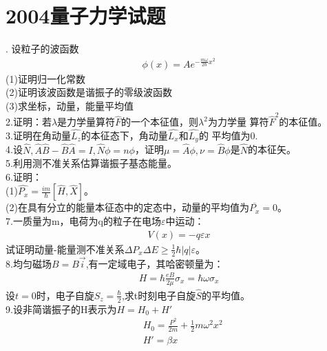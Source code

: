 \documentclass[UTF8]{article}
\title{}
\author{李承高}
\numberwithin{equation}{section}
\begin{document}
\maketitle
\thispagestyle{empty}
\newpage
\thispagestyle{empty}
\tableofcontents
\newpage

{\centering\section{2004量子力学试题}}
. 设粒子的波函数
\begin{align*}
    \phi(x)=Ae^{-\frac{m\omega}{2\hbar}x^2}
\end{align*}
(1)证明归一化常数\\
(2)证明该波函数是谐振子的零级波函数\\
(3)求坐标，动量，能量平均值\\[10pt]
2.证明：若$\lambda$是力学量算符$\hat{F}$的一个本征值，则$\lambda^2$为力学量
算符$\hat{F}^2$的本征值。\\[10pt]
3.证明在角动量$\hat{L_z}$的本征态下，角动量$\hat{L_x}$和$\hat{L_y}$的
平均值为0.\\[10pt]
4.设$\hat{N},\hat{A}\hat{B}-\hat{B}\hat{A}=I,\hat{N}\phi=n\phi$，证明$\mu=\hat{A}\phi,
\nu=\hat{B}\phi$是$\hat{N}$的本征矢。\\[10pt]
5.利用测不准关系估算谐振子基态能量。\\[10pt]
6.证明：\\
(1)$\hat{P_x}=\frac{im}{\hbar}[\hat{H},\hat{X}]$。\\
(2)在具有分立的能量本征态中的定态中，动量的平均值为$\overline{P_x}=0$。\\[10pt]
7.一质量为m，电荷为q的粒子在电场$\varepsilon$中运动：
\begin{align*}
    V(x)=-q\varepsilon x
\end{align*}
试证明动量-能量测不准关系$\Delta P_x\Delta E\geq \frac{1}{2}\hbar |q|\varepsilon$。\\[10pt]
8.均匀磁场$B=B\overrightarrow{i}$,有一定域电子，其哈密顿量为：
\begin{align*}
    H=\hbar \frac{eB}{2\mu}\sigma_x=\hbar \omega \sigma_x
\end{align*}
设$t=0$时，电子自旋$S_z=\frac{\hbar}{2}$,求t时刻电子自旋$\hat{S}$的平均值。\\[10pt]
9.设非简谐振子的H表示为$H=H_0+H'$
\begin{align*}
    &H_0=\frac{P^2}{2m}+\frac{1}{2}m\omega^2 x^2\\
    &H'=\beta x
\end{align*}
\end{document}
